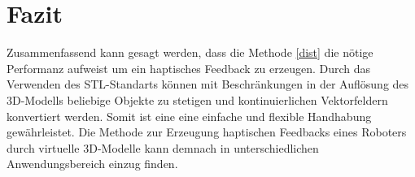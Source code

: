 \documentclass[conference]{IEEEtran}
\begin{document}
\section{Fazit}

Zusammenfassend kann gesagt werden, dass die Methode \ref*{dist} die nötige Performanz aufweist um ein 
haptisches Feedback zu erzeugen. Durch das Verwenden des STL-Standarts können mit Beschränkungen in der Auflösung des 
3D-Modells beliebige Objekte zu stetigen und kontinuierlichen Vektorfeldern konvertiert werden. Somit ist eine eine einfache und 
flexible Handhabung gewährleistet. Die Methode zur Erzeugung haptischen Feedbacks eines Roboters durch virtuelle 3D-Modelle 
kann demnach in unterschiedlichen Anwendungsbereich einzug finden.  

\printbibliography
\end{document}

